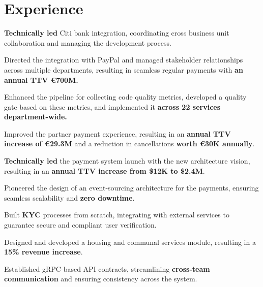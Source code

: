 \section{Experience}
\vspace{\topsep}

\vspace{\topsep}
\begin{tightemize}
    \item \textbf{Technically led} Citi bank integration, coordinating cross business unit collaboration and managing the development process.

    \item Directed the integration with PayPal and managed stakeholder relationships across multiple departments, resulting in seamless regular payments
    with \textbf{an annual TTV \euro 700M.}

    \item Enhanced the pipeline for collecting code quality metrics, developed a quality gate based on these metrics, and implemented it
    \textbf{across 22 services department-wide.}

    \item Improved the partner payment experience, resulting in an \textbf{annual TTV increase of \euro 29.3M} and a reduction in cancellations
    \textbf{worth \euro 30K annually}.
\end{tightemize}
\sectionsep


\begin{tightemize}
    \item \textbf{Technically led} the payment system launch with the new architecture vision, resulting in an
    \textbf{annual TTV increase from \$12K to \$2.4M}.

    \item  Pioneered the design of an event-sourcing architecture for the payments, ensuring seamless scalability and \textbf{zero downtime}.

    \item  Built \textbf{KYC} processes from scratch, integrating with external services to guarantee secure and compliant user
    verification.

    \item  Designed and developed a housing and communal services module, resulting in a \textbf{15\% revenue increase}.

    \item  Established gRPC-based API contracts, streamlining \textbf{cross-team communication} and ensuring consistency across the system.
\end{tightemize}
\sectionsep

